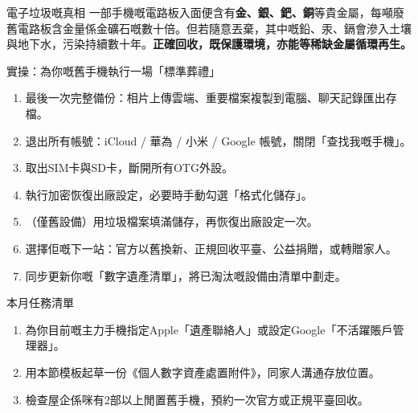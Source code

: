 \begin{tcbinfo}{電子垃圾嘅真相}
一部手機嘅電路板入面便含有\textbf{金、銀、鈀、銅}等貴金屬，每噸廢舊電路板含金量係金礦石嘅數十倍。但若隨意丟棄，其中嘅鉛、汞、鎘會滲入土壤與地下水，污染持續數十年。\textbf{正確回收，既保護環境，亦能等稀缺金屬循環再生。}

\end{tcbinfo}

\begin{tcbpractice}{實操：為你嘅舊手機執行一場「標準葬禮」}
\begin{enumerate}
  \item 最後一次完整備份：相片上傳雲端、重要檔案複製到電腦、聊天記錄匯出存檔。
  \item 退出所有帳號：iCloud / 華為 / 小米 / Google 帳號，關閉「查找我嘅手機」。
  \item 取出SIM卡與SD卡，斷開所有OTG外設。
  \item 執行加密恢復出廠設定，必要時手動勾選「格式化儲存」。
  \item （僅舊設備）用垃圾檔案填滿儲存，再恢復出廠設定一次。
  \item 選擇佢嘅下一站：官方以舊換新、正規回收平臺、公益捐贈，或轉贈家人。
  \item 同步更新你嘅「數字遺產清單」，將已淘汰嘅設備由清單中劃走。
\end{enumerate}

\end{tcbpractice}

\begin{tcbpractice}{本月任務清單}
\begin{enumerate}
  \item 為你目前嘅主力手機指定Apple「遺產聯絡人」或設定Google「不活躍賬戶管理器」。
  \item 用本節模板起草一份《個人數字資產處置附件》，同家人溝通存放位置。
  \item 檢查屋企係咪有2部以上閒置舊手機，預約一次官方或正規平臺回收。
\end{enumerate}

\end{tcbpractice}
